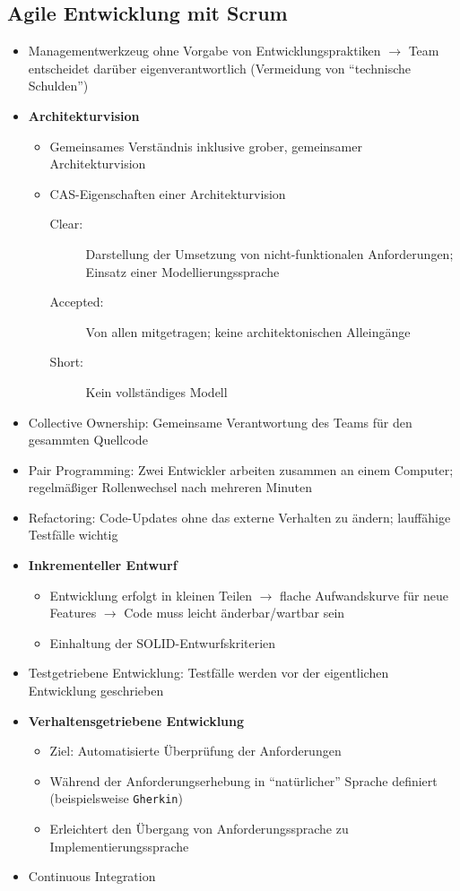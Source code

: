 \subsection{Agile Entwicklung mit Scrum}
\begin{itemize}
	\item Managementwerkzeug ohne Vorgabe von Entwicklungspraktiken \(\rightarrow\) Team entscheidet darüber eigenverantwortlich (Vermeidung von "`technische Schulden"')
	\item \textbf{Architekturvision}
	\begin{itemize}
		\item Gemeinsames Verständnis inklusive grober, gemeinsamer Architekturvision
		\item CAS-Eigenschaften einer Architekturvision
		\begin{description}
			\item[Clear:] Darstellung der Umsetzung von nicht-funktionalen Anforderungen; Einsatz einer Modellierungssprache
			\item[Accepted:] Von allen mitgetragen; keine architektonischen Alleingänge
			\item[Short:] Kein vollständiges Modell
		\end{description}
	\end{itemize}
	\item Collective Ownership: Gemeinsame Verantwortung des Teams für den gesammten Quellcode
	\item Pair Programming: Zwei Entwickler arbeiten zusammen an einem Computer; regelmäßiger Rollenwechsel nach mehreren Minuten
	\item Refactoring: Code-Updates ohne das externe Verhalten zu ändern; lauffähige Testfälle wichtig
	\item \textbf{Inkrementeller Entwurf}
	\begin{itemize}
		\item Entwicklung erfolgt in kleinen Teilen \(\rightarrow\) flache Aufwandskurve für neue Features \(\rightarrow\) Code muss leicht änderbar/wartbar sein
		\item Einhaltung der SOLID-Entwurfskriterien
	\end{itemize}
	\item Testgetriebene Entwicklung: Testfälle werden vor der eigentlichen Entwicklung geschrieben
	\item \textbf{Verhaltensgetriebene Entwicklung}
	\begin{itemize}
		\item Ziel: Automatisierte Überprüfung der Anforderungen
		\item Während der Anforderungserhebung in "`natürlicher"' Sprache definiert (beispielsweise \texttt{Gherkin})
		\item Erleichtert den Übergang von Anforderungssprache zu Implementierungssprache
	\end{itemize}
	\item Continuous Integration
\end{itemize}



